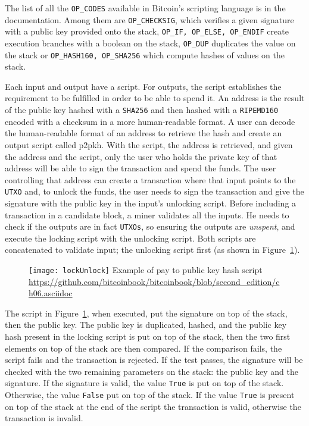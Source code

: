 The list of all the \texttt{OP\_CODES} available in Bitcoin's scripting language
is in the documentation. Among them are \texttt{OP\_CHECKSIG}, which verifies a given
signature with a public key provided onto the stack, \texttt{OP\_IF, OP\_ELSE,
OP\_ENDIF} create execution branches with a boolean on the stack,
\texttt{OP\_DUP} duplicates the value on the stack or \texttt{OP\_HASH160,
OP\_SHA256} which compute hashes of values on the stack.

Each input and output have a script. For outputs, the script establishes the
requirement to be fulfilled in order to be able to spend it. An address is the result
of the public key hashed with a \texttt{SHA256} and then hashed with a
\texttt{RIPEMD160} encoded with a checksum in a more human-readable format. A
user can decode the human-readable format of an address to retrieve the hash
and create an output script called \gls{p2pkh}. With the script, the
address is retrieved, and given the address and the script, only the user who
holds the private key of that address will be able to sign the transaction and
spend the funds. The user controlling that address can create a transaction where that
input points to the \texttt{UTXO} and, to unlock the funds, the user needs to sign
the transaction and give the signature with the public key in the input's
unlocking script. Before including a transaction in a candidate block, a miner
validates all the inputs. He needs to check if the outputs are in fact
\texttt{UTXOs}, so ensuring the outputs are \textit{unspent}, and execute the
locking script with the unlocking script. Both scripts are concatenated to
validate input; the unlocking script first (as shown in
Figure~\ref{fig:lockUnlock}).

\begin{figure}[H]
	\centering
	\texttt{[image: lockUnlock]}
  {Example of pay to public key hash script}
	{\url{https://github.com/bitcoinbook/bitcoinbook/blob/second_edition/ch06.asciidoc}}
	\label{fig:lockUnlock}
\end{figure}

The script in Figure~\ref{fig:lockUnlock}, when executed, put the signature on
top of the stack, then the public key. The public key is duplicated, hashed,
and the public key hash present in the locking script is put on top of the stack,
then the two first elements on top of the stack are then compared. If the
comparison fails, the script fails and the transaction is rejected. If the
test passes, the signature will be checked with the two remaining parameters on
the stack: the public key and the signature. If the signature is valid, the
value \texttt{True} is put on top of the stack. Otherwise, the
value \texttt{False} put on top of the stack. If the value \texttt{True} is present
on top of the stack at the end of the script the transaction is valid,
otherwise the transaction is invalid.

